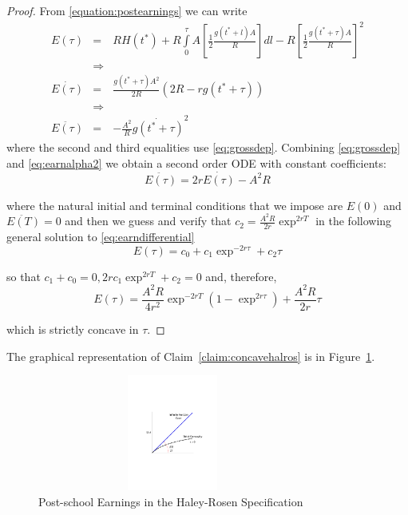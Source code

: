 \begin{proof}
\indent From \eqref{equation:postearnings} we can write
\begin{eqnarray}
E(\tau) &=& RH(t^*) + R \int \limits _{0} ^{\tau} A \left[\frac{1}{2} \frac{g(t^* + l)A}{R} \right]dl - R \left[\frac{1}{2} \frac{g(t^* + \tau)A}{R} \right]^{2} \nonumber \\
&\Rightarrow& \nonumber \\
\dot{E(\tau)} &=& \frac{g (t^* + \tau)A^2}{2R}\left( 2R -rg (t^* + \tau) \right) \nonumber \\
&\Rightarrow& \nonumber \\
\ddot{E(\tau)} &=& -\frac{A^2}{R}\dot{g(t^* + \tau)}^2 \label{eq:earnalpha2}
\end{eqnarray}
where the second and third equalities use \eqref{eq:grossdep}. Combining \eqref{eq:grossdep} and \eqref{eq:earnalpha2} we obtain a second order ODE with constant coefficients:
\begin{equation}
\ddot{E(\tau)} = 2r \dot{E(\tau)} - A^2 R \label{eq:earndifferential}
\end{equation} 

\noindent where the natural initial and terminal conditions that we impose are $E(0)$ and $\ddot{E(T)} = 0$ and then we guess and verify that $c_{2} = \frac{A^2 R}{2r}\exp^{2rT}$ in the following general solution to \eqref{eq:earndifferential}
\begin{equation}
E(\tau) = c_{0} + c_{1}\exp^{-2r \tau} + c_{2} \tau
\end{equation}

\noindent so that $c_{1} + c_{0} = 0, 2rc_1 \exp^{2rT}  + c_{2} = 0$ and, therefore,
\begin{equation}
E(\tau) = \frac{A^2 R}{4r^2} \exp^{-2r T} \left( 1 - \exp^{2r \tau} \right) + \frac{A^2 R}{2r} \tau \label{eq:earningspostalpha12}
\end{equation}

\noindent which is strictly concave in $\tau$.
\end{proof}


\indent The graphical representation of Claim~\ref{claim:concavehalros} is in Figure~\ref{fig:halros}. 
\begin{center}
\begin{figure}[H]
\caption{Post-school Earnings in the Haley-Rosen Specification} \label{fig:halros}
\centering
\includegraphics[width=3.5in, height=1.5in]{Figures/fig-finite-horiz.pdf}
\end{figure}
\end{center}

